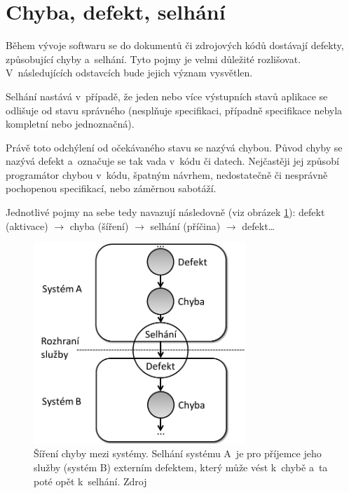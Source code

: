 	\section{Chyba, defekt, selhání}
	Během vývoje softwaru se do dokumentů či zdrojových kódů dostávají defekty, způsobující chyby a~selhání. Tyto pojmy je velmi důležité rozlišovat. V~následujících odstavcích bude jejich význam vysvětlen.
	
	Selhání nastává v~případě, že jeden nebo více výstupních stavů aplikace se odlišuje od stavu správného (nesplňuje specifikaci, případně specifikace nebyla kompletní nebo jednoznačná).
	
	Právě toto odchýlení od očekávaného stavu se nazývá chybou. Původ chyby se nazývá defekt a~označuje se tak vada v~kódu či datech. Nejčastěji jej způsobí programátor chybou v~kódu, špatným návrhem, nedostatečně či nesprávně pochopenou specifikací, nebo záměrnou sabotáží.
	
	Jednotlivé pojmy na sebe tedy navazují následovně (viz obrázek \ref{Bug}): defekt (aktivace) $\to$ chyba (šíření) $\to$ selhání (příčina) $\to$ defekt\dots
	\begin{figure}[ht!]
		\centering
		\includegraphics[width=8cm]{img/Bug.png}
		\caption{Šíření chyby mezi systémy. Selhání systému A~je pro příjemce jeho služby (systém B) externím defektem, který může vést k~chybě a~ta poté opět  k~selhání. Zdroj \citep{RizeniKvalitySW}}
		\label{Bug}
	\end{figure}